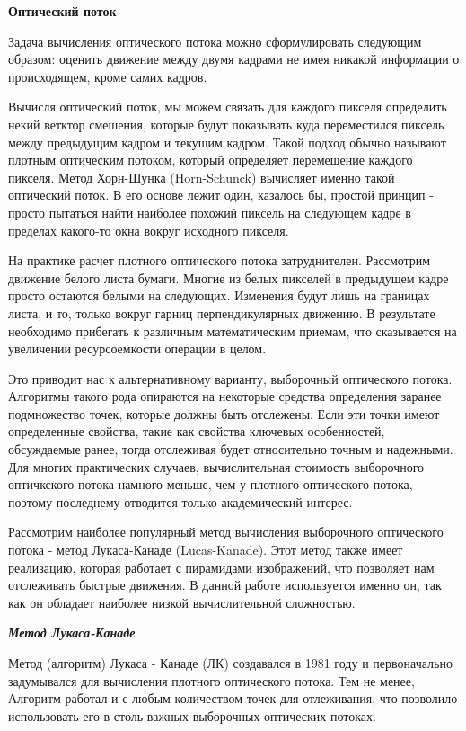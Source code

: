 \textbf{Оптический поток}

Задача вычисления оптического потока можно сформулировать следующим образом: оценить движение между двумя кадрами не имея никакой информации о происходящем, кроме самих кадров\cite{OpenCVBook}. 

Вычисля оптический поток, мы можем связать для каждого пикселя определить некий ветктор смешения, которые будут показывать куда переместился пиксель между предыдущим кадром и текущим кадром. Такой  подход обычно называют плотным оптическим потоком, который определяет перемещение каждого пикселя. Метод Хорн-Шунка (Horn-Schunck) вычисляет именно такой оптический поток. В его основе лежит один, казалось бы, простой принцип - просто пытаться найти наиболее похожий пиксель на следующем кадре в пределах какого-то окна вокруг исходного пикселя.

На практике расчет плотного оптического потока затруднителен. Рассмотрим движение белого листа бумаги. Многие из белых пикселей в предыдущем кадре просто остаются белыми на следующих. Изменения будут лишь на границах листа, и то, только вокруг гарниц перпендикулярных движению. В результате необходимо прибегать к различным математическим приемам, что сказывается на увеличении ресурсоемкости операции в целом. 

Это приводит нас к альтернативному варианту, выборочный оптического потока. Алгоритмы такого рода опираются на некоторые средства определения заранее подмножество точек, которые должны быть отслежены. Если эти точки имеют определенные свойства, такие как свойства ключевых особенностей, обсуждаемые ранее, тогда отслеживая будет относительно точным и надежными. Для многих практических случаев, вычислительная стоимость выборочного оптичкского потока намного меньше, чем у плотного оптического потока, поэтому последнему отводится только академический интерес.

Рассмотрим наиболее популярный метод вычисления выборочного оптического потока - метод Лукаса-Канаде (Lucas-Kanade). Этот метод также имеет реализацию, которая работает с пирамидами изображений, что позволяет нам отслеживать быстрые движения. В данной работе используется именно он, так как он обладает наиболее низкой вычислительной сложностью. 

{\large \textit{\textbf{Метод Лукаса-Канаде}}}
\label{label:lucas-kanade-math}

Метод (алгоритм) Лукаса - Канаде (ЛК) создавался в 1981 году и первоначально задумывался для вычисления плотного оптического потока. Тем не менее, Алгоритм работал и с любым количеством точек для отлеживания, что позволило использовать его в столь важных выборочных оптических потоках. 

